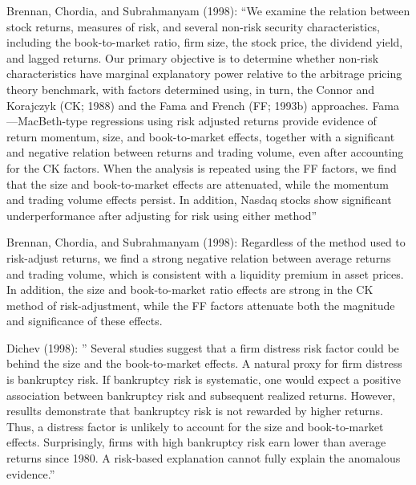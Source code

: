\documentclass[
  letterpaper,
  DIV=11,
  numbers=noendperiod]{scrreprt}
\begin{document}
Brennan, Chordia, and Subrahmanyam (1998): ``We examine the relation
between stock returns, measures of risk, and several non-risk security
characteristics, including the book-to-market ratio, firm size, the
stock price, the dividend yield, and lagged returns. Our primary
objective is to determine whether non-risk characteristics have marginal
explanatory power relative to the arbitrage pricing theory benchmark,
with factors determined using, in turn, the Connor and Korajczyk (CK;
1988) and the Fama and French (FF; 1993b) approaches.
Fama---MacBeth-type regressions using risk adjusted returns provide
evidence of return momentum, size, and book-to-market effects, together
with a significant and negative relation between returns and trading
volume, even after accounting for the CK factors. When the analysis is
repeated using the FF factors, we find that the size and book-to-market
effects are attenuated, while the momentum and trading volume effects
persist. In addition, Nasdaq stocks show significant underperformance
after adjusting for risk using either method''

Brennan, Chordia, and Subrahmanyam (1998): Regardless of the method used
to risk-adjust returns, we find a strong negative relation between
average returns and trading volume, which is consistent with a liquidity
premium in asset prices. In addition, the size and book-to-market ratio
effects are strong in the CK method of risk-adjustment, while the FF
factors attenuate both the magnitude and significance of these effects.

Dichev (1998): '' Several studies suggest that a firm distress risk
factor could be behind the size and the book-to-market effects. A
natural proxy for firm distress is bankruptcy risk. If bankruptcy risk
is systematic, one would expect a positive association between
bankruptcy risk and subsequent realized returns. However, resullts
demonstrate that bankruptcy risk is not rewarded by higher returns.
Thus, a distress factor is unlikely to account for the size and
book-to-market effects. Surprisingly, firms with high bankruptcy risk
earn lower than average returns since 1980. A risk-based explanation
cannot fully explain the anomalous evidence.''
\end{document}
